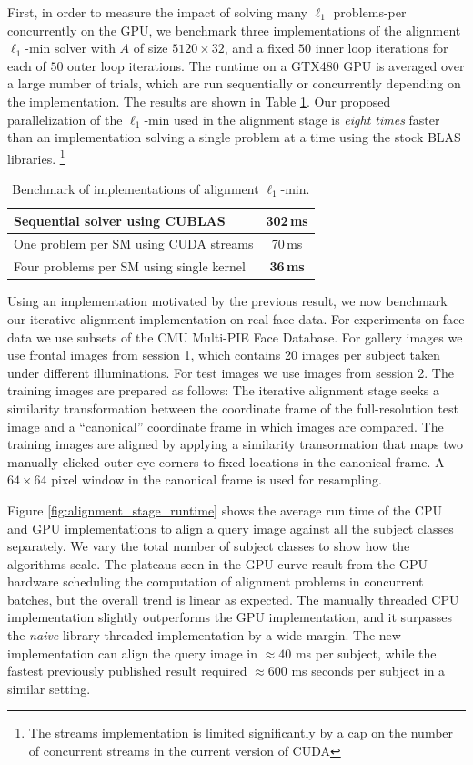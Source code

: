 \documentclass[preprint]{sigplanconf}
\begin{document}
First, in order to measure the impact of solving many
$\ell_1$ problems-per concurrently on the GPU, we benchmark three implementations of the
alignment $\ell_1$-min solver with $A$ of size $5120 \times 32$, and a fixed
$50$ inner loop iterations for each of $50$ outer loop iterations. The runtime
on a GTX480 GPU is averaged over a large number of trials, which are run
sequentially or concurrently depending on the implementation.
The results are shown in Table \ref{tbl:ubench}.
Our proposed parallelization of the $\ell_1$-min used in the alignment
stage is {\em eight times} faster than an implementation solving a single
problem at a time using the stock BLAS libraries.
\footnote{The streams implementation is limited significantly by a 
cap on the number of concurrent streams in the current version of CUDA}
\begin{table}[t!]
\caption{\small Benchmark of implementations of alignment $\ell_1$-min.}
\small
\centering
\begin{tabular}{|l|c|}
\hline
Sequential solver using CUBLAS & 302\,ms \\
\hline
One problem per SM using CUDA streams & 70\,ms  \\
\hline
Four problems per SM using single kernel & {\bf 36\,ms} \\
\hline
\end{tabular} 
\label{tbl:ubench}
\end{table}
 
Using an implementation motivated by the previous result, we now benchmark our
iterative alignment implementation on real face data.  For experiments on face
data we use subsets of the CMU Multi-PIE Face Database.  For gallery images we
use frontal images from session 1, which contains 20 images per subject taken
under different illuminations. For test images we use images from session 2.
The training images are prepared as follows: The iterative alignment stage
seeks a similarity transformation between the coordinate frame of the
full-resolution test image and a ``canonical'' coordinate frame in which images
are compared.  The training images are aligned by applying a similarity
transormation that maps two manually clicked outer eye corners to fixed
locations in the canonical frame.  A $64 \times 64$
pixel window in the canonical frame is used for resampling. 

Figure \ref{fig:alignment_stage_runtime} shows the average run time of the CPU and GPU implementations to align
a query image against all the subject classes separately. We vary the total number of
subject classes to show how the algorithms scale. The plateaus seen in the GPU curve
result from the GPU hardware scheduling the computation of alignment
problems in concurrent batches, but the overall trend is linear as expected.
The manually threaded CPU implementation slightly outperforms the GPU implementation,
and it surpasses the \emph{naive}
library threaded implementation by a wide margin.
The new implementation can align the query
image in $\approx 40$ ms per subject, 
while the fastest previously published result \cite{WagnerA2011-PAMI}
required $\approx 600$ ms seconds per subject in a similar setting.  
\end{document}
